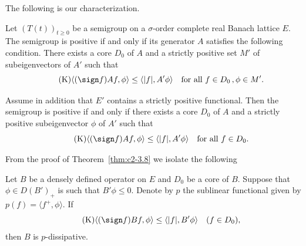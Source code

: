The following is our characterization.
\begin{theorem}\label{thm:c2-3.8}
Let $(T(t))_{t \geq 0}$ be a semigroup on a $\sigma$-order complete real Banach lattice $E$. 
The semigroup is positive if and only if its generator $A$ satisfies the following condition.
There exists a core $D_{0}$ of\/ $A$ and a strictly positive set $M'$ of subeigenvectors of\/ $A'$ such that
\begin{equation}\label{eq:c2-K4} \tag{K}
\langle(\sign f) Af,\phi \rangle \leq \langle|f|,A'\phi\rangle \quad \text{for all } f \in D_{0} \, ,  \phi \in M'.
\end{equation}
\end{theorem}
\begin{corollary}\label{cor:c2-3.9}
Assume in addition that $E'$ contains a strictly positive functional. 
Then the semigroup is positive if and only if there
exists a core $D_{0}$ of\/ $A$ and a strictly positive subeigenvector $\phi$
of\/ $A'$ such that
\begin{equation}\label{eq:c2-K5} \tag{K}
\langle(\sign f) Af,\phi \rangle \leq \langle|f|,A'\phi\rangle \quad \text{for all } f \in D_{0}.
\end{equation}
\end{corollary}
From the proof of Theorem~\ref{thm:c2-3.8}   we isolate the following
\begin{proposition}\label{prop:c2-3.10}
Let $B$ be a densely defined operator on $E$ and $D_{0}$ be a core of\/ $B$.
Suppose that $\phi \in D(B')_{+}$ is such that $B'\phi \leq 0$.
Denote by $p$ the sublinear functional given by $p(f) = \langle f^{+},\phi \rangle$. 
If
\begin{equation*}\label{eq:c2-K6} \tag{K}
	\langle(\sign f) Bf,\phi \rangle \leq \langle|f|,B'\phi\rangle \quad (f \in D_{0}),
\end{equation*}
then $B$ is $p$-dissipative.
\end{proposition}
